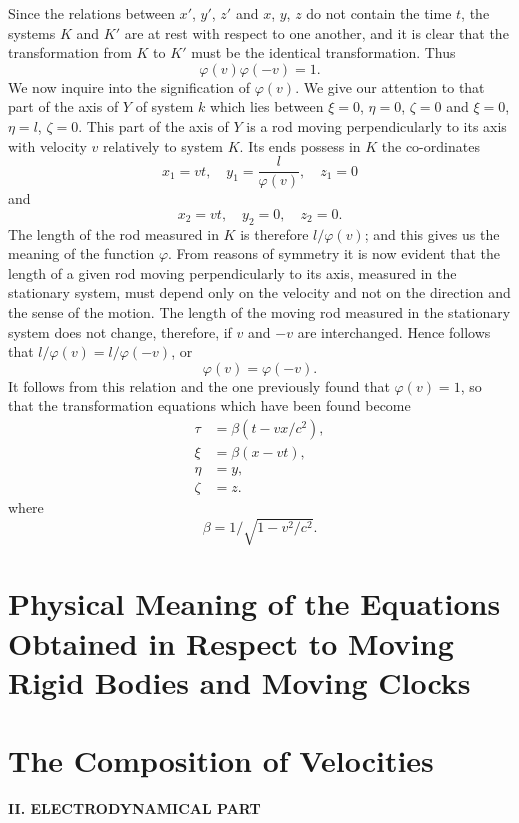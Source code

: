 Since the relations between $x'$, $y'$, $z'$ and $x$, $y$, $z$ do not contain the time $t$, the systems $K$ and $K'$ are at rest with respect to one another, and it is clear that the transformation from $K$ to $K'$ must be the identical transformation. Thus $$ \varphi(v)\varphi(-v) = 1 .$$ We now inquire into the signification of $\varphi(v)$. We give our attention to that part of the axis of $Y$ of system $k$ which lies between $\xi = 0$, $\eta = 0$, $\zeta = 0$ and $\xi = 0$, $\eta = l$, $\zeta = 0$. This part of the axis of $Y$ is a rod moving perpendicularly to its axis with velocity $v$ relatively to system $K$. Its ends possess in $K$ the co-ordinates $$ x_1 = vt,\quad y_1 = \frac{l}{\varphi(v)},\quad z_1 = 0 $$ and $$ x_2 = vt,\quad y_2 = 0,\quad z_2 = 0 .$$ The length of the rod measured in $K$ is therefore $ l/\varphi(v) $; and this gives us the meaning of the function $\varphi$. From reasons of symmetry it is now evident that the length of a given rod moving perpendicularly to its axis, measured in the stationary system, must depend only on the velocity and not on the direction and the sense of the motion. The length of the moving rod measured in the stationary system does not change, therefore, if $v$ and $-v$ are interchanged. Hence follows that $l/\varphi(v) = l/\varphi(-v)$, or $$\varphi(v) = \varphi(-v) .$$ It follows from this relation and the one previously found that $\varphi(v) = 1$, so that the transformation equations which have been found become
\begin{align*}
	\tau &= \beta(t - vx/c^2), \\
	\xi &= \beta(x - vt), \\
	\eta &= y, \\
	\zeta &= z.
\end{align*}
where $$\beta = 1/\sqrt{1-v^2/c^2}.$$


\section{Physical Meaning of the Equations Obtained in Respect to Moving Rigid Bodies and Moving Clocks}




\section{The Composition of Velocities}




\vspace{2em}
\begin{center}
    \Large\textbf{II. ELECTRODYNAMICAL PART}
\end{center}

